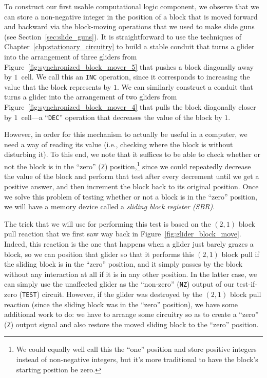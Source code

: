 To construct our first usable computational logic component, we observe that we can store a non-negative integer in the position of a block that is moved forward and backward via the block-moving operations that we used to make slide guns (see Section~\ref{sec:slide_guns}). It is straightforward to use the techniques of Chapter~\ref{chp:stationary_circuitry} to build a stable conduit that turns a glider into the arrangement of three gliders from Figure~\ref{fig:synchronized_block_mover_5} that pushes a block diagonally away by $1$~cell. We call this an \texttt{INC} operation, since it corresponds to increasing the value that the block represents by $1$. We can similarly construct a conduit that turns a glider into the arrangement of two gliders from Figure~\ref{fig:synchronized_block_mover_4} that pulls the block diagonally closer by $1$~cell---a ``\texttt{DEC}'' operation that decreases the value of the block by $1$.

However, in order for this mechanism to actually be useful in a computer, we need a way of reading its value (i.e., checking where the block is without disturbing it). To this end, we note that it suffices to be able to check whether or not the block is in the ``zero'' (\texttt{Z}) position,\footnote{We could equally well call this the ``one'' position and store positive integers instead of non-negative integers, but it's more traditional to have the block's starting position be zero.} since we could repeatedly decrease the value of the block and perform that test after every decrement until we get a positive answer, and then increment the block back to its original position. Once we solve this problem of testing whether or not a block is in the ``zero'' position, we will have a memory device called a \emph{sliding block register (SBR)}.

The trick that we will use for performing this test is based on the $(2,1)$ block pull reaction that we first saw way back in Figure~\ref{fig:glider_block_move}. Indeed, this reaction is the one that happens when a glider just barely grazes a block, so we can position that glider so that it performs this $(2,1)$ block pull if the sliding block is in the ``zero'' position, and it simply passes by the block without any interaction at all if it is in any other position. In the latter case, we can simply use the unaffected glider as the ``non-zero'' (\texttt{NZ}) output of our test-if-zero (\texttt{TEST}) circuit. However, if the glider was destroyed by the $(2,1)$ block pull reaction (since the sliding block was in the ``zero'' position), we have some additional work to do: we have to arrange some circuitry so as to create a ``zero'' (\texttt{Z}) output signal and also restore the moved sliding block to the ``zero'' position.

